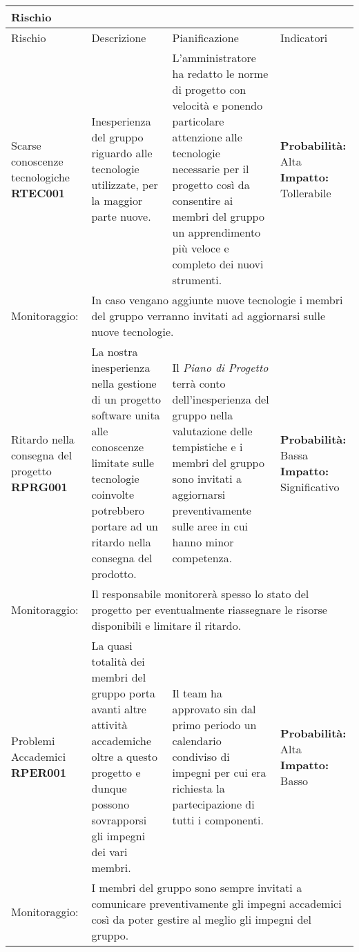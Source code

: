 \documentclass[../piano-di-progetto.tex]{subfiles}
\begin{document}
      \begin{longtable}[H]{|p{10em}|p{13em}|p{13em}|p{10em}|}
      \rowcolor{darkgray!90!}
      \color{white}
      {\textbf{Rischio}} & \color{white}{\textbf{Descrizione}} & \color{white}{\textbf{Pianificazione}} & \color{white}{\textbf{Indicatori}} \\
      \endhead{}
      Rischio & Descrizione & Pianificazione & Indicatori\\
      \hline %
  \endhead{}
  Scarse conoscenze tecnologiche \textbf{RTEC001} & Inesperienza del gruppo riguardo alle tecnologie utilizzate, per la maggior parte nuove. & L'amministratore ha redatto le norme di progetto con velocità e ponendo particolare attenzione alle tecnologie necessarie per il progetto così da consentire ai membri del gruppo un apprendimento più veloce e completo dei nuovi strumenti. & \textbf{Probabilità:} Alta \textbf{Impatto:} Tollerabile \\
  Monitoraggio: & \multicolumn{3}{p{38.5em}|}{In caso vengano aggiunte nuove tecnologie i membri del gruppo verranno invitati ad aggiornarsi sulle nuove tecnologie.}\\
  \hline %
  Ritardo nella consegna del progetto \textbf{RPRG001} & La nostra inesperienza nella gestione di un progetto software unita alle conoscenze limitate sulle tecnologie coinvolte potrebbero portare ad un ritardo nella consegna del prodotto. & Il \textit{Piano di Progetto} terrà conto dell'inesperienza del gruppo nella valutazione delle tempistiche e i membri del gruppo sono invitati a aggiornarsi preventivamente sulle aree in cui hanno minor competenza. & \textbf{Probabilità:}   Bassa \textbf{Impatto: }  Significativo  \\
  Monitoraggio: & \multicolumn{3}{p{38.5em}|}{Il responsabile monitorerà spesso lo stato del progetto per eventualmente riassegnare le risorse disponibili e limitare il ritardo.}\\
  \hline %
  Problemi Accademici \textbf{RPER001} & La quasi totalità dei membri del gruppo porta avanti altre attività accademiche oltre a questo progetto e dunque possono sovrapporsi gli impegni dei vari membri. & Il team ha approvato sin dal primo periodo un calendario condiviso di impegni per cui era richiesta la partecipazione di tutti i componenti. & \textbf{Probabilità: }   Alta \textbf{Impatto: }    Basso\\
  Monitoraggio: & \multicolumn{3}{p{38.5em}|}{I membri del gruppo sono sempre invitati a comunicare preventivamente gli impegni accademici così da poter gestire al meglio gli impegni del gruppo.}\\

\end{longtable}
\end{document}
